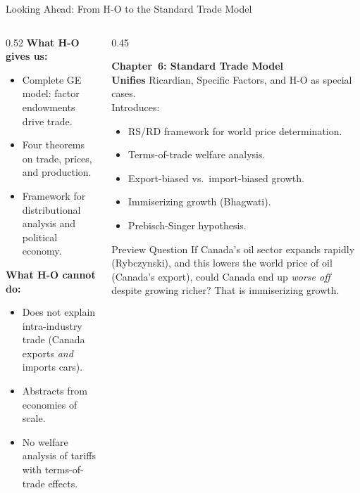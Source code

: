 \documentclass[aspectratio=169]{beamer}
\begin{document}
\begin{frame}[shrink=15]{Looking Ahead: From H-O to the Standard Trade Model}
\begin{columns}[T]
\begin{column}{0.52\textwidth}
\textbf{What H-O gives us:}
\begin{itemize}\small
  \item Complete GE model: factor endowments drive trade.
  \item Four theorems on trade, prices, and production.
  \item Framework for distributional analysis and
        political economy.
\end{itemize}
\vspace{0.2em}
\textbf{What H-O cannot do:}
\begin{itemize}\small
  \item Does not explain intra-industry trade
        (Canada exports \emph{and} imports cars).
  \item Abstracts from economies of scale.
  \item No welfare analysis of tariffs with
        terms-of-trade effects.
\end{itemize}
\end{column}
\begin{column}{0.45\textwidth}
\begin{varbox}
\small\textbf{Chapter~6: Standard Trade Model}\\[0.4em]
\textbf{Unifies} Ricardian, Specific Factors, and H-O
as special cases.\\[0.3em]
Introduces:
\begin{itemize}
  \item RS/RD framework for world price determination.
  \item Terms-of-trade welfare analysis.
  \item Export-biased vs.\ import-biased growth.
  \item Immiserizing growth (Bhagwati).
  \item Prebisch-Singer hypothesis.
\end{itemize}
\end{varbox}
\vspace{0.4em}
\begin{insight}{Preview Question}
\small If Canada's oil sector expands rapidly
(Rybczynski), and this lowers the world price of
oil (Canada's export), could Canada end up
\emph{worse off} despite growing richer?
That is immiserizing growth.
\end{insight}
\end{column}
\end{columns}
\end{frame}
\end{document}
